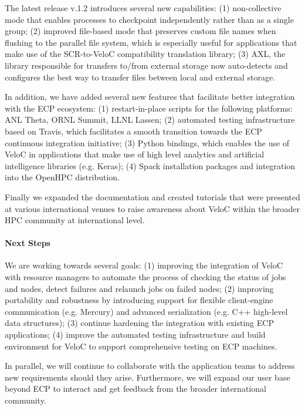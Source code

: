 The latest release v.1.2 introduces several new capabilities: (1) non-collective mode that enables processes
to checkpoint independently rather than as a single group;
(2) improved file-based mode that preserves custom file names
when flushing to the parallel file system, which is especially
useful for applications that make use of the SCR-to-VeloC 
compatibility translation library; (3) AXL, the library
responsible for transfers to/from external storage now auto-detects
and configures the best way to transfer files between local and
external storage.

In addition, we have added several new features that facilitate better integration with the ECP ecosystem: (1) restart-in-place scripts
for the following platforms: ANL Theta, ORNL Summit, LLNL Lassen;
(2) automated testing infrastructure based on Travis, which facilitates a smooth transition towards the ECP continuous integration initiative;
(3) Python bindings, which enables the use of VeloC in applications
that make use of high level analytics and artificial intelligence
libraries (e.g. Keras); (4) Spack installation packages and integration
into the OpenHPC distribution.


Finally we expanded the documentation and created tutorials that were
presented at various international venues to raise awareness about
VeloC within the broader HPC community at international level.

\paragraph{Next Steps}

We are working towards several goals: (1) improving the integration 
of VeloC  with resource managers to automate the process of checking 
the status of jobs and nodes, detect failures and relaunch jobs on failed nodes; (2) improving portability and robustness by introducing support for
flexible client-engine communication (e.g. Mercury) and advanced
serialization (e.g. C++ high-level data structures); (3) continue 
hardening the integration with existing ECP applications; (4) improve 
the automated testing infrastructure  and build environment for VeloC to support comprehensive testing on ECP machines. 

In parallel, we will continue to collaborate with the
application teams to address new requirements should they arise.
Furthermore, we will expand our user base beyond ECP to interact and
get feedback from the broader international community.
